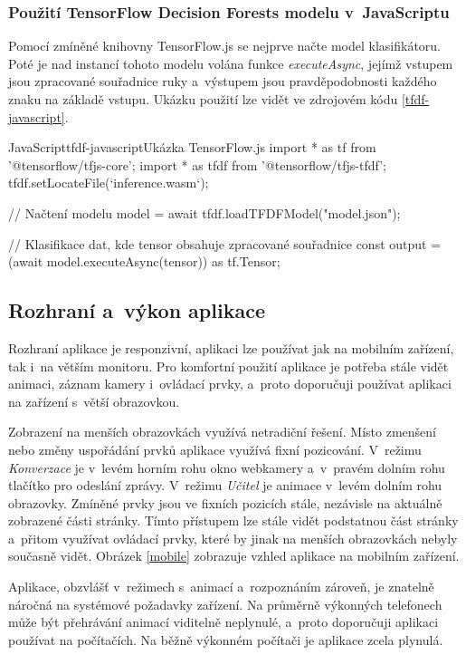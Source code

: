 \documentclass[
  master,
  program=ainfvs,
  biblatex,
  figures=true,
  tables=false,
  sourcecodes=true,
  glossaries,
  index
]{kidiplom}
\begin{document}
    
        \subsubsection{Použití TensorFlow Decision Forests modelu v~JavaScriptu}
            Pomocí zmíněné knihovny TensorFlow.js se nejprve načte model klasifikátoru. Poté je nad instancí tohoto modelu volána funkce \emph{executeAsync}, jejímž vstupem jsou zpracované souřadnice ruky a~výstupem jsou pravděpodobnosti každého znaku na základě vstupu. Ukázku použití lze vidět ve zdrojovém kódu \ref{tfdf-javascript}.

            \begin{kicode}{JavaScript}{tfdf-javascript}{Ukázka TensorFlow.js}
import * as tf from '@tensorflow/tfjs-core';
import * as tfdf from '@tensorflow/tfjs-tfdf';
tfdf.setLocateFile(`inference.wasm`);

// Načtení modelu
model = await tfdf.loadTFDFModel("model.json");

// Klasifikace dat, kde tensor obsahuje zpracované souřadnice
const output = (await model.executeAsync(tensor)) as tf.Tensor;
            \end{kicode}

    
    \subsection{Rozhraní a~výkon aplikace}
        Rozhraní aplikace je responzivní, aplikaci lze používat jak na mobilním zařízení, tak i~na větším monitoru. Pro komfortní použití aplikace je potřeba stále vidět animaci, záznam kamery i~ovládací prvky, a~proto doporučuji používat aplikaci na zařízení s~větší obrazovkou.

        Zobrazení na menších obrazovkách využívá netradiční řešení. Místo zmenšení nebo změny uspořádání prvků aplikace využívá fixní pozicování. V~režimu \emph{Konverzace} je v~levém horním rohu okno webkamery a~v~pravém dolním rohu tlačítko pro odeslání zprávy. V~režimu \emph{Učitel} je animace v~levém dolním rohu obrazovky. Zmíněné prvky jsou ve fixních pozicích stále, nezávisle na aktuálně zobrazené části stránky. Tímto přístupem lze stále vidět podstatnou část stránky a~přitom využívat ovládací prvky, které by jinak na menších obrazovkách nebyly současně vidět. Obrázek \ref{mobile} zobrazuje vzhled aplikace na mobilním zařízení.

        Aplikace, obzvlášť v~režimech s~animací a~rozpoznáním zároveň, je znatelně náročná na systémové požadavky zařízení. Na průměrně výkonných telefonech může být přehrávání animací viditelně neplynulé, a~proto doporučuji aplikaci používat na počítačích. Na běžně výkonném počítači je aplikace zcela plynulá.
\end{document}
